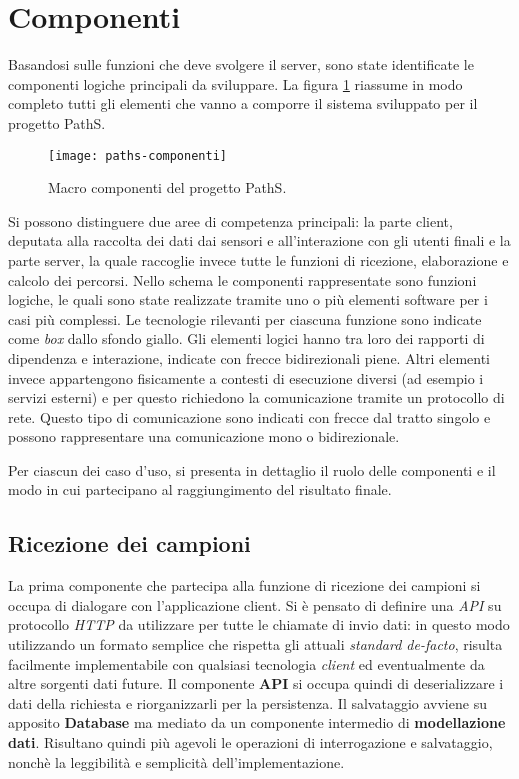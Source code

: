 \section{Componenti}
Basandosi sulle funzioni che deve svolgere il server, sono state identificate le componenti logiche principali da sviluppare. La figura \ref{fig:paths-componenti} riassume in modo completo tutti gli elementi che vanno a comporre il sistema sviluppato per il progetto PathS. 

\begin{figure}[!ht]
  \centering
  \texttt{[image: paths-componenti]}
  \caption{\footnotesize{Macro componenti del progetto PathS.}}
  \label{fig:paths-componenti}
\end{figure}

Si possono distinguere due aree di competenza principali: la parte client, deputata alla raccolta dei dati dai sensori e all'interazione con gli utenti finali e la parte server, la quale raccoglie invece tutte le funzioni di ricezione, elaborazione e calcolo dei percorsi. Nello schema le componenti rappresentate sono funzioni logiche, le quali sono state realizzate tramite uno o più elementi software per i casi più complessi. Le tecnologie rilevanti per ciascuna funzione sono indicate come \emph{box} dallo sfondo giallo. Gli elementi logici hanno tra loro dei rapporti di dipendenza e interazione, indicate con frecce bidirezionali piene. Altri elementi invece appartengono fisicamente a contesti di esecuzione diversi (ad esempio i servizi esterni) e per questo richiedono la comunicazione tramite un protocollo di rete. Questo tipo di comunicazione sono indicati con frecce dal tratto singolo e possono rappresentare una comunicazione mono o bidirezionale.

Per ciascun dei caso d'uso, si presenta in dettaglio il ruolo delle componenti e il modo in cui partecipano al raggiungimento del risultato finale.

\subsection{Ricezione dei campioni}
La prima componente che partecipa alla funzione di ricezione dei campioni si occupa di dialogare con l'applicazione client. Si è pensato di definire una \emph{API} su protocollo \emph{HTTP} da utilizzare per tutte le chiamate di invio dati: in questo modo utilizzando un formato semplice che rispetta gli attuali \emph{standard de-facto}, risulta facilmente implementabile con qualsiasi tecnologia \emph{client} ed eventualmente da altre sorgenti dati future. Il componente \textbf{API} si occupa quindi di deserializzare i dati della richiesta e riorganizzarli per la persistenza. Il salvataggio avviene su apposito \textbf{Database} ma mediato da un componente intermedio di \textbf{modellazione dati}. Risultano quindi più agevoli le operazioni di interrogazione e salvataggio, nonchè la leggibilità e semplicità dell'implementazione.

